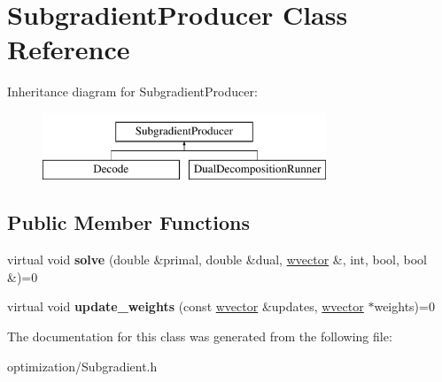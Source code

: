 \hypertarget{classSubgradientProducer}{
\section{SubgradientProducer Class Reference}
\label{classSubgradientProducer}
}
Inheritance diagram for SubgradientProducer:\begin{figure}[H]
\begin{center}
\leavevmode
\includegraphics[height=2cm]{classSubgradientProducer}
\end{center}
\end{figure}
\subsection*{Public Member Functions}
\begin{DoxyCompactItemize}
\item 
\hypertarget{classSubgradientProducer_acea0e6ef35f9f3fd2f14872740471628}{
virtual void {\bfseries solve} (double \&primal, double \&dual, \hyperlink{classsvector}{wvector} \&, int, bool, bool \&)=0}
\label{classSubgradientProducer_acea0e6ef35f9f3fd2f14872740471628}

\item 
\hypertarget{classSubgradientProducer_a5b471526b337913722f56221b2461d89}{
virtual void {\bfseries update\_\-weights} (const \hyperlink{classsvector}{wvector} \&updates, \hyperlink{classsvector}{wvector} $\ast$weights)=0}
\label{classSubgradientProducer_a5b471526b337913722f56221b2461d89}

\end{DoxyCompactItemize}


The documentation for this class was generated from the following file:\begin{DoxyCompactItemize}
\item 
optimization/Subgradient.h\end{DoxyCompactItemize}
